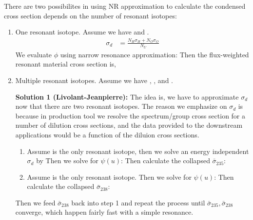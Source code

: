 \documentclass{school-22.211-notes}
\begin{document}
There are two possibilites in using NR approximation to calculate the condensed cross section depends on the number of resonant isotopes: 
\begin{enumerate}
\item One resonant isotope. Assume we have  and . 
\begin{align}
\sigma_d &= \frac{N_H \sigma_H + N_O \sigma_O}{N_U} 
\end{align}
We evaluate $\phi$ using narrow resonance approximation: 
Then the flux-weighted resonant material cross section is,

\item Multiple resonant isotopes. Assume we have , , and . 

  \textbf{Solution 1 (Livolant-Jeanpierre):} The idea is, we have to approximate $\sigma_d$ now that there are two resonant isotopes. The reason we emphasize on $\sigma_d$ is because in production tool we resolve the spectrum/group cross section for a number of dilution cross sections, and the data provided to the downstream applications would be a function of the diluion cross sections.  
  \begin{enumerate}
  \item Assume  is the only resonant isotope, then we solve an energy independent $\sigma_d$ by 
    Then we solve for $\psi(u)$:
    Then calculate the collapsed $\bar{\sigma}_{235}$:
  \item Assume  is the only resonant isotope. 
    Then we solve for $\psi(u)$:
    Then calculate the collapsed $\bar{\sigma}_{238}$:
  \end{enumerate}
  Then we feed $\bar{\sigma}_{238}$ back into step 1 and repeat the process until $\bar{\sigma}_{235}, \bar{\sigma}_{238}$ converge, which happen fairly fast with a simple resonance. 



\end{enumerate}
\end{document}
